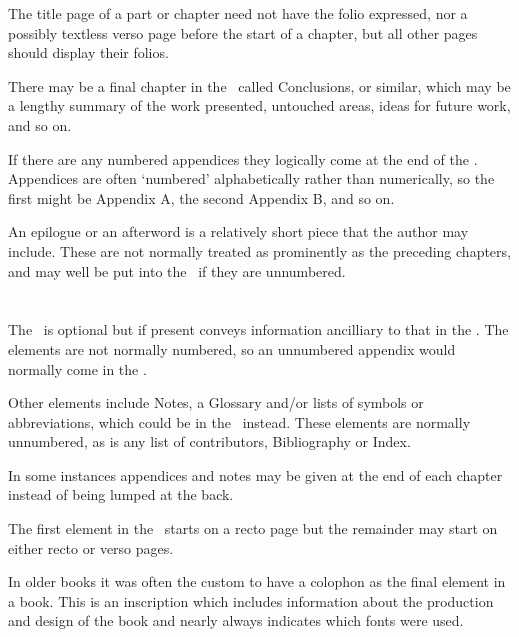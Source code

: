 \documentclass[10pt,a4paper,oneside,extrafontsizes]{memoir}%
\begin{document}
\begin{paracol}{2}
    The title page of a part
 or chapter need not have the folio expressed, nor
a possibly textless verso page before the start of a chapter, but all other 
pages should display their folios.

    There may be a final chapter in the \pixmainmatter\ called Conclusions, 
or similar, which may be a lengthy summary of the work presented, untouched
areas, ideas for future work, and so on.

    If there are any numbered appendices 
they logically come at the end of
the \pixmainmatter. Appendices are often `numbered' alphabetically rather
than numerically, so the first might be Appendix A, the second Appendix B,
and so on.

    An epilogue or an afterword is a 
relatively short piece that the author may
include. These are not normally treated as prominently as the preceding
chapters, and may well be put into the \pixbackmatter\ if they are 
unnumbered.
\end{paracol}

\section{\prBackmatter}

\begin{paracol}{2}
\switchEng
    The \pixbackmatter\
is optional but if present conveys information ancilliary
to that in the \pixmainmatter. The elements are not normally numbered, so an
unnumbered appendix\index{appendix} would normally come in the \pixbackmatter.

    Other elements include Notes, a Glossary
 and/or lists of symbols or 
abbreviations, which could be in the 
\pixfrontmatter\ instead. These elements 
are normally unnumbered, as is any list of contributors, 
Bibliography\index{bibliography} or Index\index{index}.

    In some instances appendices 
and notes may be given at the end of each
chapter instead of being lumped at the back.

    The first element in the \pixbackmatter\ starts on a recto page but the 
remainder may start on either recto or verso pages.

    In older books it was often the custom to have a colophon
as the final element in a book. This is an inscription which includes 
information about the production and design of the book and nearly 
always indicates which fonts\index{font} were used.
\end{paracol}
\end{document}

